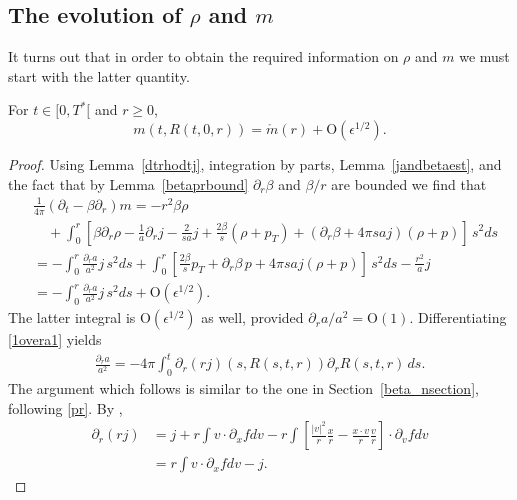 \documentclass[11pt]{article}
\begin{document}
\subsection{The evolution of $\rho$ and $m$}
%
%
It turns out that in order to obtain the required information on $\rho$ and $m$
we must start with the latter quantity.
%
\begin{lemma}\label{massalongchar}
  For $t\in [0,T^\ast[$ and $r\geq 0$,
  \[
  m(t,R(t,0,r)) = \mathring{m}(r) + \mathrm{O}(\epsilon^{1/2}).
  \]
\end{lemma}
%
\begin{proof}
  Using Lemma~\ref{dtrhodtj}, integration by parts, Lemma~\ref{jandbetaest},
  and the fact that by Lemma~\ref{betaprbound}
  $\partial_r\beta$ and $\beta/r$
  are bounded we find that
  \begin{align}\label{pdem}
    &
    \frac{1}{4\pi} \left(\partial_t -\beta\partial_r\right) m = - r^2 \beta \rho
    \nonumber\\
    &
    \quad {}+
    \int_0^r\left[\beta \partial_r\rho
      -\frac{1}{a}\partial_r j - \frac{2}{s a} j
      + \frac{2\beta}{s}(\rho + p_T)
      + (\partial_r \beta + 4\pi s a j)(\rho + p)\right]
    \, s^2 ds
    \nonumber\\
    &
    =
    - \int_0^r\frac{\partial_r a}{a^2} j\, s^2 ds
    + \int_0^r \left[\frac{2\beta}{s} p_T + \partial_r \beta \, p
      + 4\pi s a j(\rho + p)\right]\, s^2 ds
    - \frac{r^2}{a} j
    \nonumber\\
    &
    =
    - \int_0^r\frac{\partial_r a}{a^2} j\, s^2 ds + \mathrm{O}(\epsilon^{1/2}).
  \end{align}
  The latter integral is $\mathrm{O}(\epsilon^{1/2})$ as well, provided
  $\partial_r a/a^2 = \mathrm{O}(1)$.
  Differentiating \eqref{1overa1} yields
  \begin{align}\label{dra}
    \frac{\partial_r a}{a^2}
    = -4\pi \int_0^t \partial_r(r j)(s,R(s,t,r)) \partial_r R(s,t,r)\, ds.
  \end{align}
  The argument which follows is similar to the one in
  Section~\ref{beta_nsection},
  following \eqref{pr}. By \cite[Lemma~6.6]{GB},
  \begin{align} \label{drrj}
    \partial_r(r j)
    &=
    j + r \int v\cdot \partial_x f dv -
    r \int \left[\frac{|v|^2}{r}\frac{x}{r}
    - \frac{x\cdot v}{r}\frac{v}{r}\right]\cdot
    \partial_v f dv\nonumber \\
    &=
    r  \int v\cdot \partial_x f dv - j.
  \end{align}

\end{proof}
\end{document}
